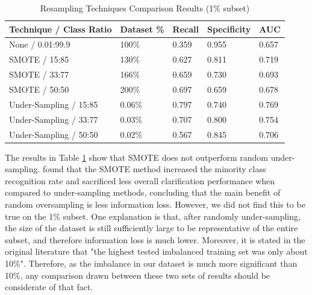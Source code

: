         \begin{table}[H]
            \centering
            \caption{Resampling Techniques Comparison Results (1\% subset)} \vspace{0.5cm}
            \label{5: table_resampling_techniques_subset}
                \begin{tabular}{|p{5cm}|p{2.25cm}|p{1.75cm}|p{2cm}|p{2cm}|}
                    \hline \textbf{Technique / Class Ratio} &  \textbf{Dataset \%} & \textbf{Recall} & \textbf{Specificity} & \textbf{AUC} \\ \hline \hline
                    None / 0.01:99.9 & 100\% & 0.359 & 0.955 & 0.657 \\ \hline
                    SMOTE / 15:85 & 130\% & 0.627 & 0.811  & 0.719 \\ \hline
                    SMOTE / 33:77 & 166\% & 0.659 & 0.730  & 0.693 \\ \hline
                    SMOTE / 50:50 & 200\% & 0.697 & 0.659  & 0.678 \\ \hline
                    Under-Sampling / 15:85 & 0.06\% & 0.797 & 0.740  & 0.769 \\ \hline
                    Under-Sampling / 33:77 & 0.03\% & 0.707 & 0.800  & 0.754 \\ \hline
                    Under-Sampling / 50:50 & 0.02\% & 0.567 & 0.845  & 0.706 \\ \hline
                \end{tabular}
        \end{table}
        
        The results in Table \ref{5: table_resampling_techniques_subset} show that SMOTE does not outperform random under-sampling. \cite{resamlping_methods} found that the SMOTE method increased the minority class recognition rate and sacrificed less overall clarification performance when compared to under-sampling methods, concluding that the main benefit of random oversampling is less information loss. However, we did not find this to be true on the 1\% subset. One explanation is that, after randomly under-sampling, the size of the dataset is still sufficiently large to be representative of the entire subset, and therefore information loss is much lower. Moreover, it is stated in the original literature that "the highest tested imbalanced training set was only about 10\%". Therefore, as the imbalance in our dataset is much more significant than 10\%, any comparison drawn between these two sets of results should be considerate of that fact. 
        
